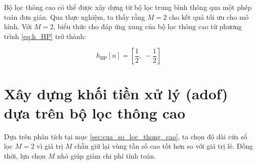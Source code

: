 Bộ lọc thông cao có thể được xây dựng từ bộ lọc trung bình thông qua một phép toán đơn giản. Qua thực nghiệm, ta thấy rằng \( M = 2 \) cho kết quả tối ưu cho mô hình.
%
Với \( M = 2 \), biểu thức cho đáp ứng xung của bộ lọc thông cao từ phương trình \eqref{eq:h_HP} trở thành:

\begin{equation}
		\label{eq:h_HP_2}
h_{\mathrm{HP}}[n] = \left[ \frac{1}{2},\ -\frac{1}{2} \right]
\end{equation}


%
%
%

%
\section{Xây dựng khối tiền xử lý (\gls{adof}) dựa trên bộ lọc thông cao}
\label{sec:adof}
	
Dựa trên phân tích tại mục \ref{sec:cua_so_loc_thong_cao}, ta chọn độ dài cửa sổ lọc $M=2$ vì giá trị $M$ chẵn giữ lại vùng tần số cao tốt hơn so với giá trị lẻ. Đồng thời, lựa chọn $M$ nhỏ giúp giảm chi phí tính toán.

